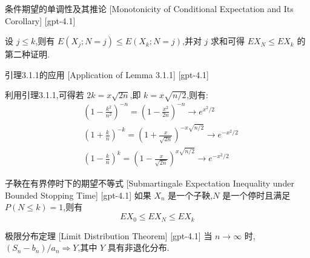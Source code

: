 \documentclass[UTF8]{ctexart}
\begin{document}
    
    
    \begin{thm}
        {条件期望的单调性及其推论}
        [Monotonicity of Conditional Expectation and Its Corollary]
        [gpt-4.1]
        
设 $j \le k$,则有 $E ( X_{j} ; N = j ) \le E ( X_{k} ; N = j )$,并对 $j$ 求和可得 $E X_{N} \le E X_{k}$ 的第二种证明.

    \end{thm}
    
    
    
    \begin{lma}
        {引理3.1.1的应用}
        [Application of Lemma 3.1.1]
        [gpt-4.1]
        
利用引理3.1.1,可得若 $2k = x\sqrt{2n}$,即 $k = x\sqrt{n/2}$,则有:
\[
\begin{aligned}
&\left(1 - \frac{k^{2}}{n^{2}}\right)^{-n} = \left(1 - \frac{x^{2}}{2n}\right)^{-n} \to e^{x^{2}/2} \\
&\left(1 + \frac{k}{n}\right)^{-k} = \left(1 + \frac{x}{\sqrt{2n}}\right)^{-x \sqrt{n/2}} \to e^{-x^{2}/2} \\
&\left(1 - \frac{k}{n}\right)^{k} = \left(1 - \frac{x}{\sqrt{2n}}\right)^{x \sqrt{n/2}} \to e^{-x^{2}/2}
\end{aligned}
\]

    \end{lma}
    
    
    
    \begin{thm}
        {子鞅在有界停时下的期望不等式}
        [Submartingale Expectation Inequality under Bounded Stopping Time]
        [gpt-4.1]
        如果 $X_{n}$ 是一个子鞅,$N$ 是一个停时且满足 $P(N \leq k) = 1$,则有
\[
E X_{0} \leq E X_{N} \leq E X_{k}
\]

    \end{thm}
    
    
    
    \begin{thm}
        {极限分布定理}
        [Limit Distribution Theorem]
        [gpt-4.1]
        当 $n \to \infty$ 时,$( S_{n} - b_{n} ) / a_{n} \Rightarrow Y$,其中 $Y$ 具有非退化分布.
    \end{thm}
    
    
    
\end{document}
